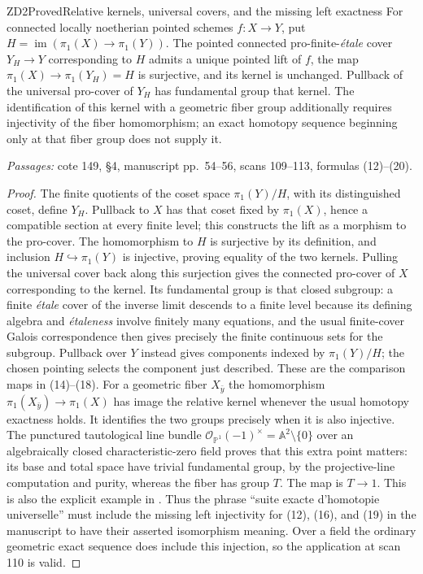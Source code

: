 \begin{result}{ZD2}{Proved}{Relative kernels, universal covers, and the missing left exactness}
For connected locally noetherian pointed schemes $f:X\to Y$, put $H=\operatorname{im}(\pi_1(X)\to\pi_1(Y))$. The pointed connected pro-finite-\emph{\'etale} cover $Y_H\to Y$ corresponding to $H$ admits a unique pointed lift of $f$, the map $\pi_1(X)\to\pi_1(Y_H)=H$ is surjective, and its kernel is unchanged. Pullback of the universal pro-cover of $Y_H$ has fundamental group that kernel. The identification of this kernel with a geometric fiber group additionally requires injectivity of the fiber homomorphism; an exact homotopy sequence beginning only at that fiber group does not supply it.
\par\emph{Passages:} cote 149, \S4, manuscript pp.~54--56, scans 109--113, formulas (12)--(20).
\end{result}
\begin{proof}
The finite quotients of the coset space $\pi_1(Y)/H$, with its distinguished coset, define $Y_H$. Pullback to $X$ has that coset fixed by $\pi_1(X)$, hence a compatible section at every finite level; this constructs the lift as a morphism to the pro-cover. The homomorphism to $H$ is surjective by its definition, and inclusion $H\hookrightarrow\pi_1(Y)$ is injective, proving equality of the two kernels. Pulling the universal cover back along this surjection gives the connected pro-cover of $X$ corresponding to the kernel. Its fundamental group is that closed subgroup: a finite \emph{\'etale} cover of the inverse limit descends to a finite level because its defining algebra and \emph{\'etaleness} involve finitely many equations, and the usual finite-cover Galois correspondence then gives precisely the finite continuous sets for the subgroup. Pullback over $Y$ instead gives components indexed by $\pi_1(Y)/H$; the chosen pointing selects the component just described. These are the comparison maps in (14)--(18).
For a geometric fiber $X_{\bar y}$ the homomorphism $\pi_1(X_{\bar y})\to\pi_1(X)$ has image the relative kernel whenever the usual homotopy exactness holds. It identifies the two groups precisely when it is also injective. The punctured tautological line bundle $\mathcal O_{\mathbb P^1}(-1)^\times=\mathbb A^2\setminus\{0\}$ over an algebraically closed characteristic-zero field proves that this extra point matters: its base and total space have trivial fundamental group, by the projective-line computation and purity, whereas the fiber has group $T$. The map is $T\to1$. This is also the explicit example in \cite[Remark 9]{DE_BES}. Thus the phrase ``suite exacte d'homotopie universelle'' must include the missing left injectivity for (12), (16), and (19) in the manuscript to have their asserted isomorphism meaning. Over a field the ordinary geometric exact sequence does include this injection, so the application at scan 110 is valid.
\end{proof}


